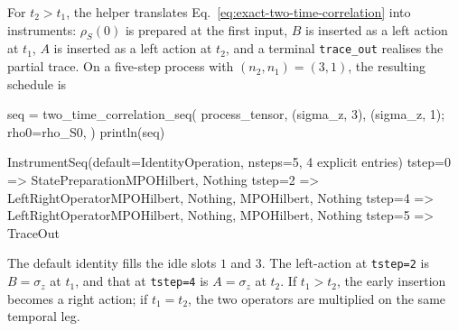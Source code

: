 For \(t_2>t_1\), the helper translates Eq.~\eqref{eq:exact-two-time-correlation} into instruments: \(\rho_S(0)\) is prepared at the first input, \(B\) is inserted as a left action at \(t_1\), \(A\) is inserted as a left action at \(t_2\), and a terminal \texttt{trace\_out} realises the partial trace. 
On a five-step process with \((n_2,n_1)=(3,1)\), the resulting schedule is
%
\begin{julialistingpair}[
    caption={Instrument sequence for \(C_{zz}(t_3,t_1)\) on a five-step process.},
    label={lst:workflow-correlations-seq},
]
    \begin{juliacode}[paired]
seq = two_time_correlation_seq(
    process_tensor, (sigma_z, 3), (sigma_z, 1);
    rho0=rho_S0,
)
println(seq)
    \end{juliacode}
    \begin{juliaoutput}[paired]
InstrumentSeq(default=IdentityOperation, nsteps=5, 4 explicit entries)
  tstep=0 => StatePreparation{MPO{Hilbert, Nothing}}
  tstep=2 => LeftRightOperator{MPO{Hilbert, Nothing}, MPO{Hilbert, Nothing}}
  tstep=4 => LeftRightOperator{MPO{Hilbert, Nothing}, MPO{Hilbert, Nothing}}
  tstep=5 => TraceOut
    \end{juliaoutput}
\end{julialistingpair}
%
The default identity fills the idle slots \(1\) and \(3\).  
The left-action at \texttt{tstep=2} is \(B=\sigma_z\) at \(t_1\), and that at \texttt{tstep=4} is \(A=\sigma_z\) at \(t_2\).
If \(t_1>t_2\), the early insertion becomes a right action; if \(t_1=t_2\), the two operators are multiplied on the same temporal leg.

